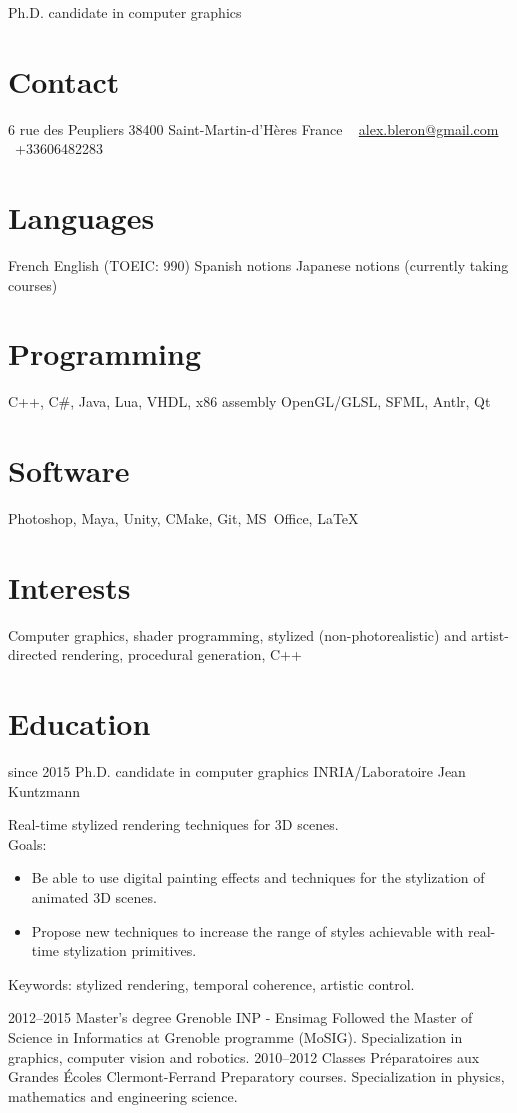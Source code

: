 \documentclass[]{friggeri-cv}
\begin{document}
       {Ph.D. candidate in computer graphics}


\begin{aside}
  \section{Contact}
    6 rue des Peupliers
    38400 Saint-Martin-d'Hères
    France
    ~
    \href{mailto:alex.bleron@gmail.com}{alex.bleron@gmail.com}
\phone~+33606482283
  \section{Languages}
    French 
    English (TOEIC: 990)
    Spanish notions
    Japanese notions (currently taking courses)
  \section{Programming}
    C++, C\#, Java, Lua, VHDL, x86 assembly
    OpenGL/GLSL, SFML, Antlr, Qt
    \section{Software}
    Photoshop, Maya, Unity, CMake, Git, MS~Office, \LaTeX
\end{aside}

\section{Interests}

Computer graphics, shader programming, stylized (non-photorealistic) and artist-directed rendering, procedural generation, C++

\section{Education}

\begin{entrylist}
  \entry
    {since 2015}
    {Ph.D. candidate in computer graphics}
    {INRIA/Laboratoire Jean Kuntzmann}
    {Real-time stylized rendering techniques for 3D scenes.\\ Goals:
    \begin{itemize} 	\item Be able to use digital painting effects and techniques for the stylization of animated 3D scenes.
    \item Propose new techniques to increase the range of styles achievable with real-time stylization primitives.
    \end{itemize}
    Keywords: stylized rendering, temporal coherence, artistic control.}
  \entry
    {2012–2015}
    {Master's degree}
    {Grenoble INP - Ensimag}
    {Followed the Master of Science in Informatics at Grenoble programme (MoSIG). Specialization in graphics, computer vision and robotics.}
  \entry
    {2010–2012}
    {Classes Préparatoires aux Grandes Écoles}
    {Clermont-Ferrand}
    {Preparatory courses. Specialization in physics, mathematics and engineering science.}
 
\end{entrylist}
\end{document}

